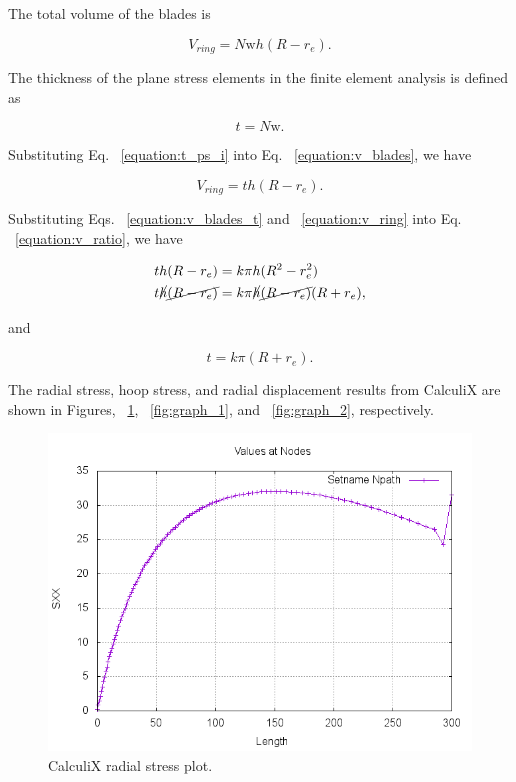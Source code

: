 \documentclass[12pt, a4paper, twoside]{article}
\begin{document}
The total volume of the blades is

\begin{equation}
	\label{equation:v_blades}
	V_{ring} = N \mathrm{w} h (R-r_e).
\end{equation}

The thickness of the plane stress elements in the finite element analysis is defined as

\begin{equation}
	\label{equation:t_ps_i}
	t = N \mathrm{w}.
\end{equation}

Substituting Eq. ~\ref{equation:t_ps_i} into Eq. ~\ref{equation:v_blades}, we have

\begin{equation}
	\label{equation:v_blades_t}
	V_{ring} = t h (R-r_e).
\end{equation}

Substituting Eqs. ~\ref{equation:v_blades_t} and ~\ref{equation:v_ring} into Eq. ~\ref{equation:v_ratio}, we have

\begin{equation}
	\begin{aligned}
		t h (R-r_e) &= k \pi h (R^2-r_e^2) \\
		t \cancel{h} \cancel{(R-r_e)} &= k \pi \cancel{h} \cancel{(R-r_e)} (R+r_e),
	\end{aligned}
\end{equation}

and

\begin{equation}
	\label{equation:t_ps}
	t = k \pi (R+r_e).
\end{equation}

The radial stress, hoop stress, and radial displacement results from CalculiX are shown in Figures, ~\ref{fig:graph_0},  ~\ref{fig:graph_1}, and  ~\ref{fig:graph_2}, respectively.

\begin{figure}[h]
	\centering
	\includegraphics[scale=0.5]{graph_0}
	\caption{CalculiX radial stress plot.}
	\label{fig:graph_0}
\end{figure}
\end{document}
